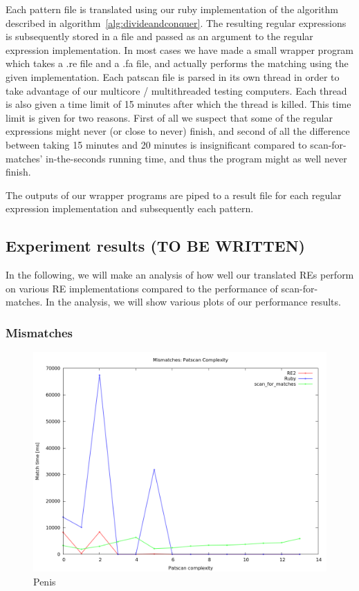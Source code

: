 \documentclass[12pt]{article}
\theoremstyle{definition}
\begin{document}
Each pattern file is translated using our ruby implementation of the algorithm described in algorithm~\ref{alg:divideandconquer}. The resulting regular expressions is subsequently stored in a file and passed as an argument to the regular expression implementation. In most cases we have made a small wrapper program which takes a .re file and a .fa file, and actually performs the matching using the given implementation. Each patscan file is parsed in its own thread in order to take advantage of our multicore / multithreaded testing computers. Each thread is also given a time limit of 15 minutes after which the thread is killed. This time limit is given for two reasons. First of all we suspect that some of the regular expressions might never (or close to never) finish, and second of all the difference between taking 15 minutes and 20 minutes is insignificant compared to scan-for-matches' in-the-seconds running time, and thus the program might as well never finish.

The outputs of our wrapper programs are piped to a result file for each regular expression implementation and subsequently each pattern. 

\subsection{Experiment results (TO BE WRITTEN)}

In the following, we will make an analysis of how well our translated REs perform on various RE implementations compared to the performance of scan-for-matches. In the analysis, we will show various plots of our performance results. 

\subsubsection{Mismatches}



\begin{figure}[H]
	\label{Complementarity}
	\begin{center}
		\includegraphics[scale=0.5]{graphs/mismatches.png}	
	\end{center}
	\caption{Penis}
\end{figure}
\end{document}
